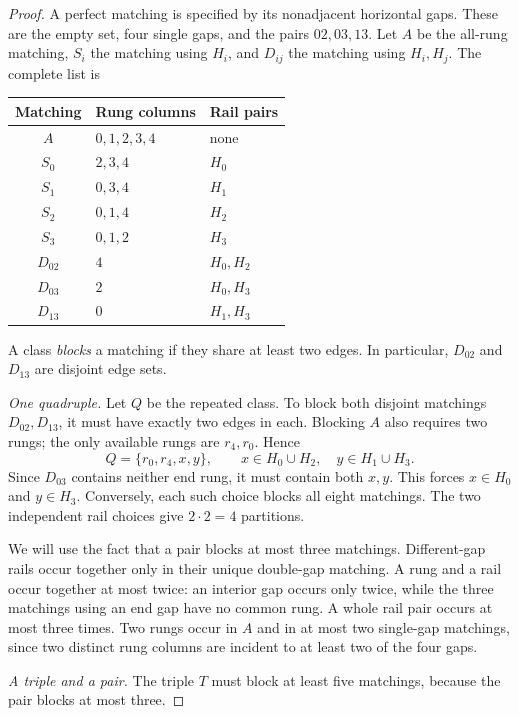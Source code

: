 \documentclass[11pt,letterpaper]{article}
\begin{document}
\begin{proof}
A perfect matching is specified by its nonadjacent horizontal gaps.
These are the empty set, four single gaps, and the pairs $02,03,13$.
Let $A$ be the all-rung matching, $S_i$ the matching using $H_i$, and
$D_{ij}$ the matching using $H_i,H_j$. The complete list is
\begin{center}\small
\begin{tabular}{cll}
\toprule
Matching & Rung columns & Rail pairs\\
\midrule
$A$ & $0,1,2,3,4$ & none\\
$S_0$ & $2,3,4$ & $H_0$\\
$S_1$ & $0,3,4$ & $H_1$\\
$S_2$ & $0,1,4$ & $H_2$\\
$S_3$ & $0,1,2$ & $H_3$\\
$D_{02}$ & $4$ & $H_0,H_2$\\
$D_{03}$ & $2$ & $H_0,H_3$\\
$D_{13}$ & $0$ & $H_1,H_3$\\
\bottomrule
\end{tabular}
\end{center}
A class \emph{blocks} a matching if they share at least two edges.
In particular, $D_{02}$ and $D_{13}$ are disjoint edge sets.

\medskip\noindent\emph{One quadruple.}
Let $Q$ be the repeated class. To block both disjoint matchings
$D_{02},D_{13}$, it must have exactly two edges in each. Blocking
$A$ also requires two rungs; the only available rungs are $r_4,r_0$.
Hence
\[
 Q=\{r_0,r_4,x,y\},\qquad
 x\in H_0\cup H_2,\quad y\in H_1\cup H_3 .
\]
Since $D_{03}$ contains neither end rung, it must contain both $x,y$.
This forces $x\in H_0$ and $y\in H_3$. Conversely, each such choice
blocks all eight matchings. The two independent rail choices give
$2\cdot2=4$ partitions.

\medskip
We will use the fact that a pair blocks at most three matchings.
Different-gap rails occur together only in their unique double-gap
matching. A rung and a rail occur together at most twice: an interior
gap occurs only twice, while the three matchings using an end gap have
no common rung. A whole rail pair occurs at most three times.
Two rungs occur in $A$ and in at most two single-gap matchings, since
two distinct rung columns are incident to at least two of the four gaps.

\newpage
\noindent\emph{A triple and a pair.}
The triple $T$ must block at least five matchings, because the pair
blocks at most three.


\end{proof}
\end{document}
